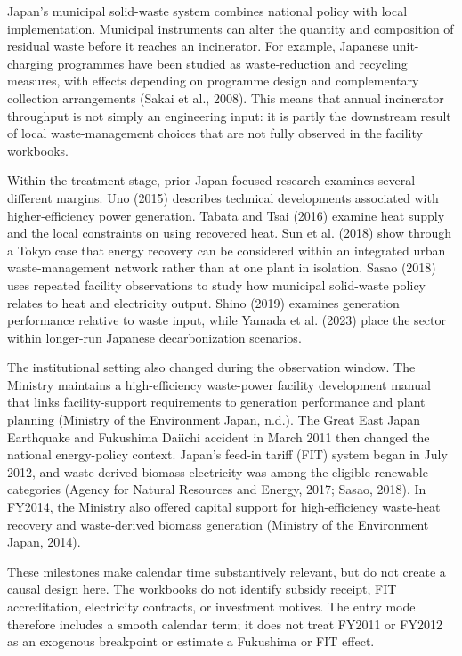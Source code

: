 \documentclass[12pt,letterpaper]{article}
\begin{document}
Japan's municipal solid-waste system combines national policy with local
implementation. Municipal instruments can alter the quantity and composition of
residual waste before it reaches an incinerator. For example, Japanese
unit-charging programmes have been studied as waste-reduction and recycling
measures, with effects depending on programme design and complementary
collection arrangements (Sakai et al., 2008). This means that annual incinerator
throughput is not simply an engineering input: it is partly the downstream result
of local waste-management choices that are not fully observed in the facility
workbooks.

Within the treatment stage, prior Japan-focused research examines several
different margins. Uno (2015) describes technical developments associated with
higher-efficiency power generation. Tabata and Tsai (2016) examine heat supply
and the local constraints on using recovered heat. Sun et al. (2018) show through
a Tokyo case that energy recovery can be considered within an integrated urban
waste-management network rather than at one plant in isolation. Sasao (2018)
uses repeated facility observations to study how municipal solid-waste policy
relates to heat and electricity output. Shino (2019) examines generation
performance relative to waste input, while Yamada et al. (2023) place the sector
within longer-run Japanese decarbonization scenarios.

The institutional setting also changed during the observation window. The
Ministry maintains a high-efficiency waste-power facility development manual
that links facility-support requirements to generation performance and plant
planning (Ministry of the Environment Japan, n.d.). The Great East Japan
Earthquake and Fukushima Daiichi accident in March 2011 then changed the
national energy-policy context. Japan's feed-in tariff (FIT) system began in
July 2012, and waste-derived biomass electricity was among the eligible
renewable categories (Agency for Natural Resources and Energy, 2017; Sasao,
2018). In FY2014, the Ministry also offered capital support for high-efficiency
waste-heat recovery and waste-derived biomass generation (Ministry of the
Environment Japan, 2014).

These milestones make calendar time substantively relevant, but do not create a
causal design here. The workbooks do not identify subsidy receipt, FIT
accreditation, electricity contracts, or investment motives. The entry model
therefore includes a smooth calendar term; it does not treat FY2011 or FY2012 as
an exogenous breakpoint or estimate a Fukushima or FIT effect.
\end{document}
